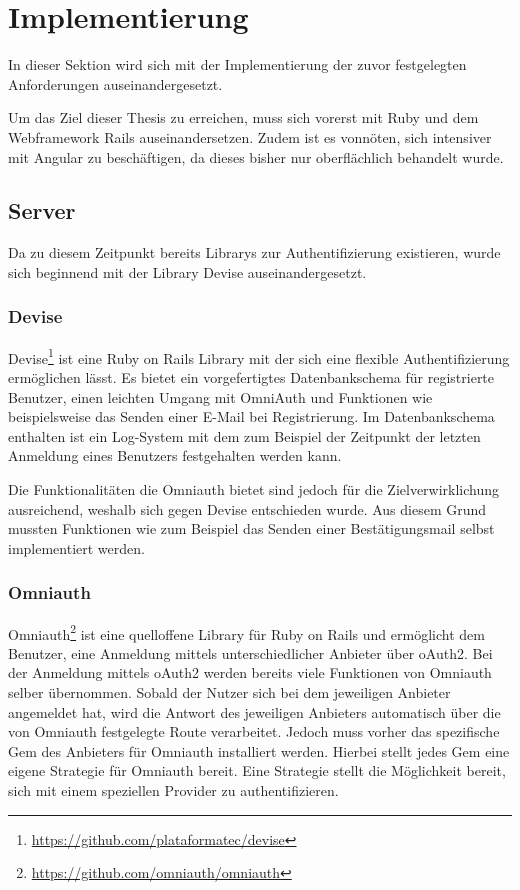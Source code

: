 \section{Implementierung}
\label{sec: implementation}
In dieser Sektion wird sich mit der Implementierung der zuvor festgelegten Anforderungen auseinandergesetzt. 

Um das Ziel dieser Thesis zu erreichen, muss sich vorerst mit Ruby und dem Webframework Rails auseinandersetzen. Zudem ist es vonnöten, sich intensiver mit Angular zu beschäftigen, da dieses bisher nur oberflächlich behandelt wurde.

\subsection{Server}
\label{sec: server}
Da zu diesem Zeitpunkt bereits Librarys zur Authentifizierung existieren, wurde sich beginnend mit der Library Devise auseinandergesetzt.

\subsubsection{Devise}
\label{sec: devise}
Devise\footnote{\url{https://github.com/plataformatec/devise}} ist eine Ruby on Rails Library mit der sich eine flexible Authentifizierung ermöglichen lässt. Es bietet ein vorgefertigtes Datenbankschema für registrierte Benutzer, einen leichten Umgang mit OmniAuth und Funktionen wie beispielsweise das Senden einer E-Mail bei Registrierung. Im Datenbankschema enthalten ist ein Log-System mit dem zum Beispiel der Zeitpunkt der letzten Anmeldung eines Benutzers festgehalten werden kann. 

Die Funktionalitäten die Omniauth bietet sind jedoch für die Zielverwirklichung ausreichend, weshalb sich gegen Devise entschieden wurde. Aus diesem Grund mussten Funktionen wie zum Beispiel das Senden einer Bestätigungsmail selbst implementiert werden.

\subsubsection{Omniauth}
\label{sec:omniauth}
Omniauth\footnote{\url{https://github.com/omniauth/omniauth}} ist eine quelloffene Library für Ruby on Rails und ermöglicht dem Benutzer, eine Anmeldung mittels unterschiedlicher Anbieter über \gls{oAuth2}. Bei der Anmeldung mittels oAuth2 werden bereits viele Funktionen von Omniauth selber übernommen. Sobald der Nutzer sich bei dem jeweiligen Anbieter angemeldet hat, wird die Antwort des jeweiligen Anbieters automatisch über die von Omniauth festgelegte Route verarbeitet. Jedoch muss vorher das spezifische Gem des Anbieters für Omniauth installiert werden. Hierbei stellt jedes Gem eine eigene Strategie für Omniauth bereit. Eine Strategie stellt die Möglichkeit bereit, sich mit einem speziellen Provider zu authentifizieren.

